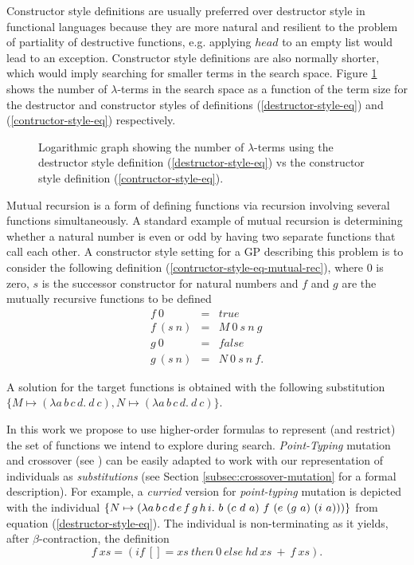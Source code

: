 Constructor style definitions are usually preferred over destructor style in functional languages because they are more natural and resilient to the problem of partiality of destructive functions, e.g. applying $head$ to an empty list would lead to an exception. Constructor style definitions are also normally shorter, which would imply searching for smaller terms in the search space. Figure \ref{destructive_vs_constructive} shows the number of $\lambda$-terms in the search space as a function of the term size for the destructor and constructor styles of definitions (\ref{destructor-style-eq}) and (\ref{contructor-style-eq}) respectively.
\begin{figure}[!ht]
  \centering
    \scalebox{0.6}{
      }
  \caption{Logarithmic graph showing the number of $\lambda$-terms using the destructor style definition (\ref{destructor-style-eq}) vs the constructor style definition (\ref{contructor-style-eq}).}
  \label{destructive_vs_constructive}
\end{figure}

Mutual recursion is a form of defining functions via recursion involving several functions simultaneously. A standard example of mutual recursion is determining whether a natural number is even or odd by having two separate functions that call each other. A constructor style setting for a GP describing this problem is to consider the following definition (\ref{contructor-style-eq-mutual-rec}), where $0$ is zero, $s$ is the successor constructor for natural numbers and $f$ and $g$ are the mutually recursive functions to be defined
\begin{equation}
  \label{contructor-style-eq-mutual-rec}
  \begin{array}{rcl}
    f\ 0 & = & true\\
    f\ (s\ n) & = & M\ 0\ s\ n\ g\\
    g\ 0 & = & false\\
    g\ (s\ n) & = & N\ 0\ s\ n\ f.
  \end{array}
\end{equation}

A solution for the target functions is obtained with the following substitution $\{M \mapsto (\lambda a\,b\,c\,d.\ d\ c), N \mapsto (\lambda a\,b\,c\,d.\ d\ c)\}$.

\cbstart
In this work we propose to use higher-order formulas to represent (and restrict) the set of functions we intend to explore during search. {\em Point-Typing} mutation and crossover (see \cite{koza1994genetic}) can be easily adapted to work with our representation of individuals as {\em substitutions} (see Section \ref{subsec:crossover-mutation} for a formal description). For example, a {\em curried} version for {\em point-typing} mutation is depicted with the individual $\{N \mapsto (\lambda a\, b\, c\, \-d\,\- e\,\- f\, g\, h\, i.\ b\ (c\ d\ a)\ f\ (e\ (g\ a)\ (i\ a)))\}$ from equation (\ref{destructor-style-eq}). The individual is non-terminating as it yields, after $\beta$-contraction, the definition
$$
f\ xs = (if\ [] = xs\ then\ 0\ else\ hd\ xs\ +\ f\ xs).
$$

